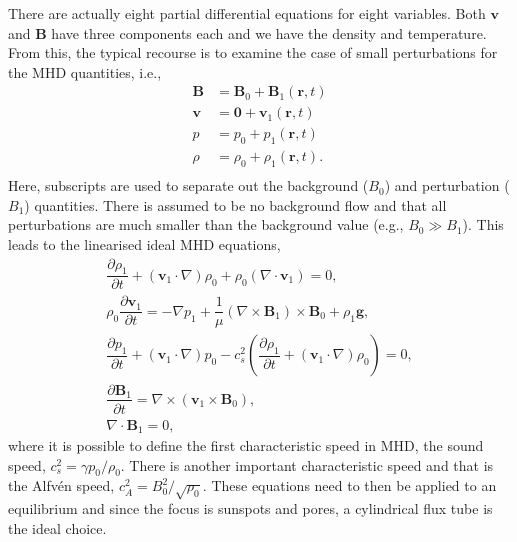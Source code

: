     There are actually eight partial differential equations for eight variables.
    Both $\boldsymbol{{v}}$ and $\boldsymbol{{B}}$ have three components each and we have the density and temperature.
    From this, the typical recourse is to examine the case of small perturbations for the MHD quantities, i.e.,
    \begin{align*}                                                         
        \boldsymbol{{B}} &= \boldsymbol{{B}}_0 + \boldsymbol{{B}}_1(\boldsymbol{r},t)\\               
        \boldsymbol{{v}} &= \boldsymbol{0} + \boldsymbol{{v}}_1(\boldsymbol{r},t)\\               
        p &= p_0 + {p_1}(\boldsymbol{r},t)\\               
        \rho &= \rho_0 + {\rho_1}(\boldsymbol{r},t).\\              
    \end{align*}
    Here, subscripts are used to separate out the background (${B}_0$) and perturbation (${B}_1$) quantities.
    There is assumed to be no background flow and that all perturbations are much smaller than the background value (e.g., ${B}_0 \gg {B}_1$).      
    This leads to the linearised ideal MHD equations,
    \begin{align}                                                         
    \dfrac{\partial \rho_1 }{\partial t} + (\boldsymbol{{v}}_1 \cdot \nabla)\rho_0 + \rho_0 (\nabla \cdot \boldsymbol{{v}}_1) =       
    0,\tag{Mass Conservation}\\                                  
    \rho_0 \dfrac{\partial \boldsymbol{{v}}_1}{\partial t} =
    -\nabla p_1 + \dfrac{1}{\mu}(\nabla \times \boldsymbol{{B}}_1) \times \boldsymbol{{B}}_0 + \rho_1 \boldsymbol{{g}},\tag{Equation of Motion}\\
    \dfrac{\partial p_1}{\partial t} + (\boldsymbol{{v}}_1 \cdot \nabla)p_0 - c_s^2 \left( \dfrac{\partial \rho_1}{\partial t} + (\boldsymbol{{v}}_1 \cdot \nabla)\rho_0 \right) = 0,\tag{Energy Equation}\\       
    \dfrac{\partial \boldsymbol{{B}}_1}{\partial t} = \nabla \times (\boldsymbol{{v}}_1 \times \boldsymbol{{B}}_0),\tag{Induction Equation}\\
    \nabla \cdot \boldsymbol{{B}}_1 = 0, \tag{Solenoid Equation}               
    \end{align}
    where it is possible to define the first characteristic speed in MHD, the sound speed, $c_s^2 = {\gamma p_0}/{\rho_0}$.
    There is another important characteristic speed and that is the Alfv\'{e}n speed, $c_A^2 = {{B}_0^2}/{\sqrt{\rho_0}}$.
    These equations need to then be applied to an equilibrium and since the focus is sunspots and pores, a cylindrical flux tube is the ideal choice.
    
